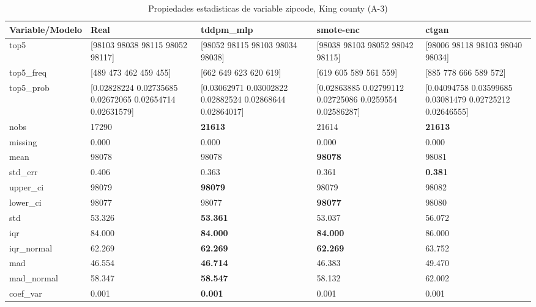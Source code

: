 \begin{table}[H]
\centering
\fontsize{8}{14}\selectfont
\caption{Propiedades  estadisticas de variable zipcode, King county (A-3)}
\label{table-stats-king county-a-3-zipcode}
\begin{tabular}{|l|m{10em}|m{10em}|m{10em}|m{10em}|}
\hline
 \rowcolor[gray]{0.8}
Variable/Modelo & Real & tddpm\_mlp & smote-enc & ctgan \\
\hline top5 & [98103 98038 98115 98052 98117] & [98052 98115 98103 98034 98038] & [98038 98103 98052 98042 98115] & [98006 98118 98103 98040 98034] \\
\hline top5\_freq & [489 473 462 459 455] & [662 649 623 620 619] & [619 605 589 561 559] & [885 778 666 589 572] \\
\hline top5\_prob & [0.02828224 0.02735685 0.02672065 0.02654714 0.02631579] & [0.03062971 0.03002822 0.02882524 0.02868644 0.02864017] & [0.02863885 0.02799112 0.02725086 0.0259554  0.02586287] & [0.04094758 0.03599685 0.03081479 0.02725212 0.02646555] \\
\hline nobs & 17290 & \bfseries 21613 & \cellcolor[rgb]{0.9, 0.54, 0.52} 21614 & \bfseries 21613 \\
\hline missing & 0.000 & 0.000 & 0.000 & 0.000 \\
\hline mean & 98078 & 98078 & \bfseries 98078 & \cellcolor[rgb]{0.9, 0.54, 0.52} 98081 \\
\hline std\_err & 0.406 & 0.363 & \cellcolor[rgb]{0.9, 0.54, 0.52} 0.361 & \bfseries 0.381 \\
\hline upper\_ci & 98079 & \bfseries 98079 & 98079 & \cellcolor[rgb]{0.9, 0.54, 0.52} 98082 \\
\hline lower\_ci & 98077 & 98077 & \bfseries 98077 & \cellcolor[rgb]{0.9, 0.54, 0.52} 98080 \\
\hline std & 53.326 & \bfseries 53.361 & 53.037 & \cellcolor[rgb]{0.9, 0.54, 0.52} 56.072 \\
\hline iqr & 84.000 & \bfseries 84.000 & \bfseries 84.000 & \cellcolor[rgb]{0.9, 0.54, 0.52} 86.000 \\
\hline iqr\_normal & 62.269 & \bfseries 62.269 & \bfseries 62.269 & \cellcolor[rgb]{0.9, 0.54, 0.52} 63.752 \\
\hline mad & 46.554 & \bfseries 46.714 & 46.383 & \cellcolor[rgb]{0.9, 0.54, 0.52} 49.470 \\
\hline mad\_normal & 58.347 & \bfseries 58.547 & 58.132 & \cellcolor[rgb]{0.9, 0.54, 0.52} 62.002 \\
\hline coef\_var & 0.001 & \bfseries 0.001 & 0.001 & \cellcolor[rgb]{0.9, 0.54, 0.52} 0.001 \\

\end{tabular}
\end{table}
